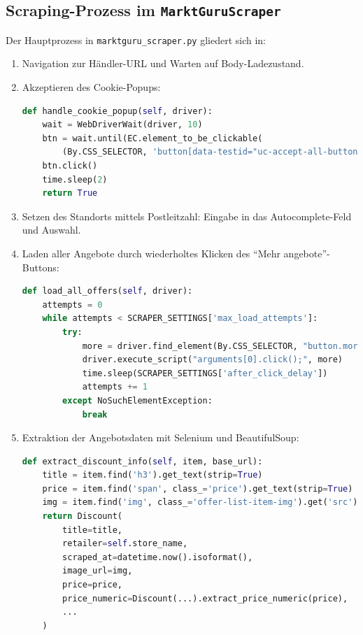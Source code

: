 \documentclass[12pt, a4paper]{report} %
\begin{document}
\subsection{Scraping-Prozess im \texttt{MarktGuruScraper}}
Der Hauptprozess in \texttt{marktguru\_scraper.py} gliedert sich in:
\begin{enumerate}
  \item Navigation zur Händler-URL und Warten auf Body-Ladezustand.
  \item Akzeptieren des Cookie-Popups:
    \begin{lstlisting}[language=Python, caption={Cookie-Popup-Handling}]
def handle_cookie_popup(self, driver):
    wait = WebDriverWait(driver, 10)
    btn = wait.until(EC.element_to_be_clickable(
        (By.CSS_SELECTOR, 'button[data-testid="uc-accept-all-button"]')))
    btn.click()
    time.sleep(2)
    return True
    \end{lstlisting}
  \item Setzen des Standorts mittels Postleitzahl: Eingabe in das Autocomplete-Feld und Auswahl.  
  \item Laden aller Angebote durch wiederholtes Klicken des "`Mehr angebote"'-Buttons:
    \begin{lstlisting}[language=Python, caption={Angebotsliste vollständig laden}]
def load_all_offers(self, driver):
    attempts = 0
    while attempts < SCRAPER_SETTINGS['max_load_attempts']:
        try:
            more = driver.find_element(By.CSS_SELECTOR, "button.more-btn.uppercase")
            driver.execute_script("arguments[0].click();", more)
            time.sleep(SCRAPER_SETTINGS['after_click_delay'])
            attempts += 1
        except NoSuchElementException:
            break
    \end{lstlisting}
  \item Extraktion der Angebotsdaten mit Selenium und BeautifulSoup:
    \begin{lstlisting}[language=Python, caption={Datenextraktion aus einem Listeneintrag}]
def extract_discount_info(self, item, base_url):
    title = item.find('h3').get_text(strip=True)
    price = item.find('span', class_='price').get_text(strip=True)
    img = item.find('img', class_='offer-list-item-img').get('src')
    return Discount(
        title=title,
        retailer=self.store_name,
        scraped_at=datetime.now().isoformat(),
        image_url=img,
        price=price,
        price_numeric=Discount(...).extract_price_numeric(price),
        ...
    )
    \end{lstlisting}
\end{enumerate}
\end{document}
